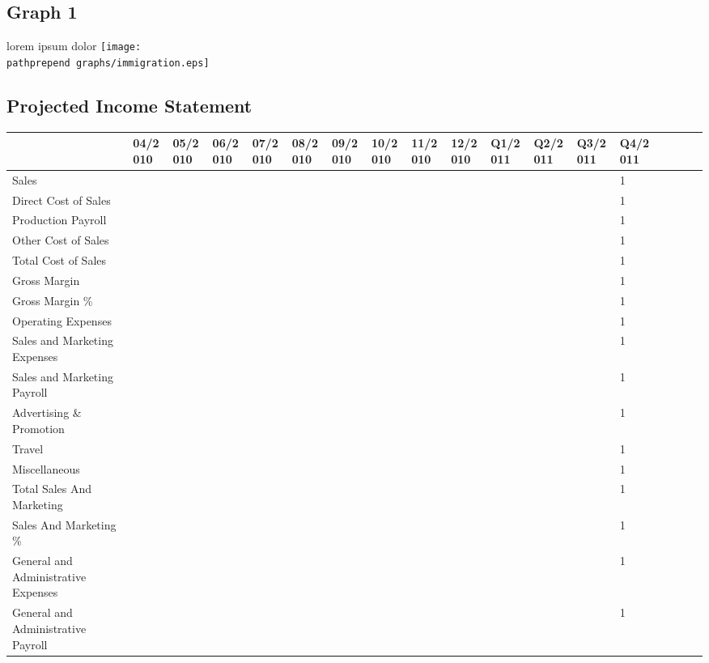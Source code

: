 \documentclass[11pt]{article}
\def\pathprepend{}%
\def\pathprepend{business_plan/}%
\begin{document}
\subsection{Graph 1}
lorem ipsum dolor
\texttt{[image: \\pathprepend graphs/immigration.eps]}
\newpage
\thispagestyle{empty}
\begin{landscape}
\subsection{Projected Income Statement}
\begin{scriptsize}
\begin{tabular}{ | l | l | l | l | l | l | l | l | l | l | l | l | l | l | l | l | l | l |}\hline
  & 04/2010 & 05/2010 & 06/2010 & 07/2010 & 08/2010 & 09/2010 & 10/2010 & 11/2010 & 12/2010 & Q1/2011 & Q2/2011 & Q3/2011 & Q4/2011 \\ \hline
  Sales & & & & & & & & & & & & & 1\\ \hline
  Direct Cost of Sales & & & & & & & & & & & & & 1 \\ \hline
  Production Payroll & & & & & & & & & & & & & 1 \\ \hline
  Other Cost of Sales & & & & & & & & & & & & & 1 \\ \hline
  Total Cost of Sales & & & & & & & & & & & & & 1 \\ \hline
  Gross Margin & & & & & & & & & & & & & 1 \\ \hline
  Gross Margin \% & & & & & & & & & & & & & 1 \\ \hline
  Operating Expenses & & & & & & & & & & & & & 1 \\ \hline
  Sales and Marketing Expenses & & & & & & & & & & & & & 1 \\ \hline
  Sales and Marketing Payroll & & & & & & & & & & & & & 1 \\ \hline
  Advertising \& Promotion & & & & & & & & & & & & & 1 \\ \hline
  Travel & & & & & & & & & & & & & 1 \\ \hline
  Miscellaneous & & & & & & & & & & & & & 1 \\ \hline
  Total Sales And Marketing & & & & & & & & & & & & & 1 \\ \hline
  Sales And Marketing \% & & & & & & & & & & & & & 1 \\ \hline
  General and Administrative Expenses & & & & & & & & & & & & & 1 \\ \hline
  General and Administrative Payroll & & & & & & & & & & & & & 1 \\ \hline

\end{tabular}
\end{scriptsize}
\end{landscape}
\end{document}
